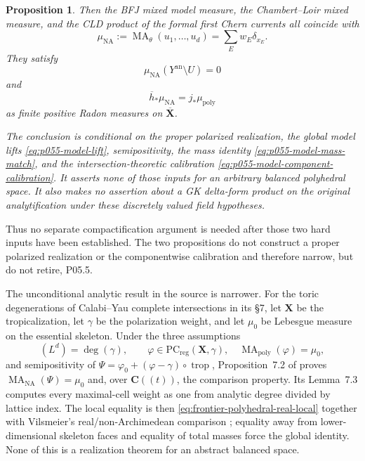\documentclass[11pt,a4paper]{article}
\newtheorem{proposition}[proposition]{Proposition}
\theoremstyle{definition}
\theoremstyle{remark}
\newcommand{\NA}{\mathrm{NA}}
\DeclareMathOperator{\MA}{MA}
\begin{document}
\begin{proposition}
Then the BFJ mixed model measure, the Chambert--Loir mixed measure, and the
CLD product of the formal first Chern currents all coincide with
\begin{equation}
 \mu_{\mathrm{NA}}
 :=\MA_\theta(u_1,\ldots,u_d)
 =\sum_Ew_E\delta_{x_E}.
 \label{eq:p055-model-common-measures}
\end{equation}
They satisfy
\begin{equation}
 \mu_{\mathrm{NA}}(Y^{\mathrm{an}}\setminus U)=0
 \label{eq:p055-model-boundary-zero}
\end{equation}
and
\begin{equation}
 \overline h_*\mu_{\mathrm{NA}}
 =j_*\mu_{\mathrm{poly}}
 \label{eq:p055-model-global-comparison}
\end{equation}
as finite positive Radon measures on $\overline{\mathbf X}$.

The conclusion is conditional on the proper polarized realization, the
global model lifts \eqref{eq:p055-model-lift}, semipositivity, the mass
identity \eqref{eq:p055-model-mass-match}, and the intersection-theoretic
calibration \eqref{eq:p055-model-component-calibration}.  It asserts none
of those inputs for an arbitrary balanced polyhedral space.  It also makes
no assertion about a GK delta-form product on the original analytification
under these discretely valued field hypotheses.
\end{proposition}




Thus no separate compactification argument is needed after those two hard
inputs have been established.  The two propositions do not construct a
proper polarized realization or the componentwise calibration and therefore
narrow, but do not retire, P05.5.

The unconditional analytic result in the source is narrower.  For the
toric degenerations of Calabi--Yau complete intersections in its
\S7, let \(\mathbf X\) be the tropicalization, let
\(\gamma\) be the polarization weight, and let \(\mu_0\) be Lebesgue
measure on the essential skeleton.  Under the three assumptions
\[
 (L^d)=\deg(\gamma),\qquad
 \varphi\in\mathrm{PC}_{\mathrm{reg}}(\mathbf X,\gamma),
 \quad\MA_{\mathrm{poly}}(\varphi)=\mu_0,
\]
and semipositivity of
\(
 \Psi=\varphi_0+(\varphi-\gamma)\circ\operatorname{trop}
\), Proposition~7.2 of \cite{BMPS26} proves
\(
 \MA_{\NA}(\Psi)=\mu_0
\)
and, over \(\mathbf C((t))\), the comparison property.  Its Lemma~7.3
computes every maximal-cell weight as one from analytic degree divided by
lattice index.  The local equality is then
\eqref{eq:frontier-polyhedral-real-local} together with Vilsmeier's
real/non-Archimedean comparison \cite[Theorem~1.1]{Vil20}; equality away
from lower-dimensional skeleton faces and equality of total masses force
the global identity.  None of this is a realization theorem for an abstract
balanced space.
\end{document}
